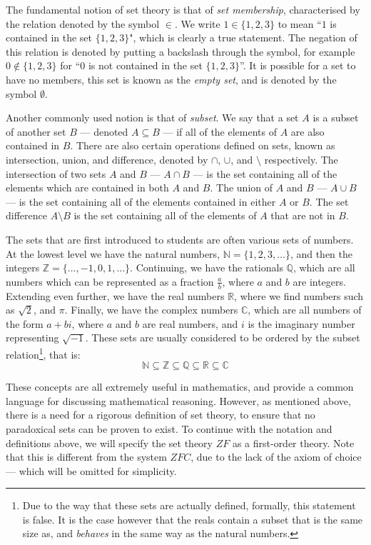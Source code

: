 \documentclass[11pt]{report}
\theoremstyle{definition}
\theoremstyle{theorem}
\theoremstyle{lemma}
\begin{document}
The fundamental notion of set theory is that of \emph{set membership}, characterised by the relation denoted by the symbol $\in$.
We write $1\in\{1,2,3\}$ to mean ``$1$ is contained in the set $\{1,2,3\}$", which is clearly a true statement. 
The negation of this relation is denoted by putting a backslash through the symbol, for example $0\notin\{1,2,3\}$ for ``$0$ is not contained in the set $\{1,2,3\}$''.
It is possible for a set to have no members, this set is known as the \emph{empty set}, and is denoted by the symbol $\emptyset$. 

Another commonly used notion is that of \emph{subset}.
We say that a set $A$ is a subset of another set $B$ --- denoted $A \subseteq B$ --- if all of the elements of $A$ are also contained in $B$.
There are also certain operations defined on sets, known as intersection, union, and difference, denoted by $\cap$, $\cup$, and $\setminus$ respectively.
The intersection of two sets $A$ and $B$ --- $A\cap B$ --- is the set containing all of the elements which are contained in both $A$ and $B$.
The union of $A$ and $B$ --- $A\cup B$ --- is the set containing all of the elements contained in either $A$ or $B$. 
The set difference $A\setminus B$ is the set containing all of the elements of $A$ that are not in $B$.

The sets that are first introduced to students are often various sets of numbers.
At the lowest level we have the natural numbers, $\mathbb{N} = \{1,2,3,\ldots\}$, and then the integers $\mathbb{Z} = \{\ldots, -1, 0, 1, \ldots\}$.
Continuing, we have the rationals $\mathbb{Q}$, which are all numbers which can be represented as a fraction $\frac{a}{b}$, where $a$ and $b$ are integers.
Extending even further, we have the real numbers $\mathbb{R}$, where we find numbers such as $\sqrt{2}$, and $\pi$. 
Finally, we have the complex numbers $\mathbb{C}$, which are all numbers of the form $a+bi$, where $a$ and $b$ are real numbers, and $i$ is the imaginary number representing $\sqrt{-1}$.
These sets are usually considered to be ordered by the subset relation\footnote{Due to the way that these sets are actually defined, formally, this statement is false. It is the case however that the reals contain a subset that is the same size as, and \emph{behaves} in the same way as the natural numbers.}, that is: 
$$\mathbb{N} \subseteq \mathbb{Z} \subseteq \mathbb{Q} \subseteq \mathbb{R} \subseteq \mathbb{C}$$

These concepts are all extremely useful in mathematics, and provide a common language for discussing mathematical reasoning. 
However, as mentioned above, there is a need for a rigorous definition of set theory, to ensure that no paradoxical sets can be proven to exist. 
To continue with the notation and definitions above, we will specify the set theory $\mathit{ZF}$ as a first-order theory.
Note that this is different from the system $\mathit{ZFC}$, due to the lack of the axiom of choice --- which will be omitted for simplicity.
\end{document}

